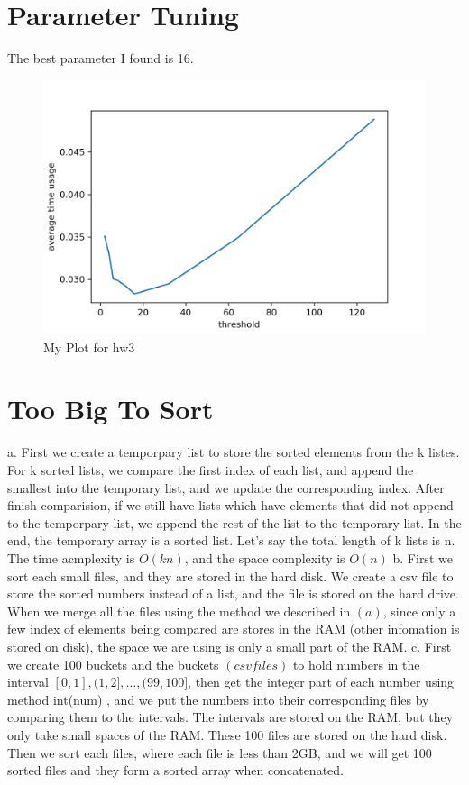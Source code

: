 \documentclass[12pt,letterpaper]{article}
\begin{document}
\pagebreak
\section{Parameter Tuning}
The best parameter I found is 16. \newline
\begin{figure}[H]
    \centering
    \includegraphics[width=0.6\linewidth]{dim.png}
    \caption{My Plot for hw3}
\end{figure}

\pagebreak
\section{Too Big To Sort}
a. First we create a temporpary list to store the sorted elements from the k listes. For k sorted lists, we compare the first index of each list, and append the smallest into the temporary list, and we update the corresponding index. After finish comparision, if we still have lists which have elements that did not append to the temporpary list, we append the rest of the list to the temporary list. In the end, the temporary array is a sorted list. Let's say the total length of k lists is n. The time acmplexity is $O(kn)$, and the space complexity is $O(n)$ \newline
b. First we sort each small files, and they are stored in the hard disk. We create a csv file to store the sorted numbers instead of a list, and the file is stored on the hard drive. When we merge all the files using the method we described in $(a)$, since only a few index of elements being compared are stores in the RAM (other infomation is stored on disk), the space we are using is only a small part of the RAM.\newline
c. First we create 100 buckets and the buckets $(csv files)$ to hold numbers in the interval $[0,1], (1,2], \dots, (99,100]$, then get the integer part of each number using method int(num) , and we put the numbers into their corresponding files by comparing them to the intervals. The intervals are stored on the RAM, but they only take small spaces of the RAM. These 100 files are stored on the hard disk. Then we sort each files, where each file is less than 2GB, and we will get 100 sorted files and they form a sorted array when concatenated.\newline
\end{document}
